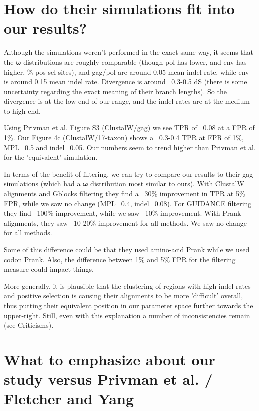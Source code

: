 \documentclass{article}
\newcommand{\omg}{\bm{\omega}\xspace}
\begin{document}
\section{How do their simulations fit into our results?}

Although the simulations weren't performed in the exact same way, it seems that the $\omg$ distributions are roughly comparable (though pol has lower, and env has higher, \% pos-sel sites), and gag/pol are around 0.05 mean indel rate, while env is around 0.15 mean indel rate. Divergence is around ~0.3-0.5 dS (there is some uncertainty regarding the exact meaning of their branch lengths). So the divergence is at the low end of our range, and the indel rates are at the medium-to-high end.

Using Privman et al. Figure S3 (ClustalW/gag) we see TPR of ~0.08 at a FPR of 1\%. Our Figure 4c (ClustalW/17-taxon) shows a ~0.3-0.4 TPR at FPR of 1\%, MPL=0.5 and indel=0.05. Our numbers seem to trend higher than Privman et al. for the 'equivalent' simulation.

In terms of the benefit of filtering, we can try to compare our results to their gag simulations (which had a $\omg$ distribution most similar to ours). With ClustalW alignments and Gblocks filtering they find a ~30\% improvement in TPR at 5\% FPR, while we saw no change (MPL=0.4, indel=0.08). For GUIDANCE filtering they find ~100\% improvement, while we saw ~10\% improvement. With Prank alignments, they saw ~10-20\% improvement for all methods. We saw no change for all methods.

Some of this difference could be that they used amino-acid Prank while we used codon Prank. Also, the difference between 1\% and 5\% FPR for the filtering measure could impact things.

More generally, it is plausible that the clustering of regions with high indel rates and positive selection is causing their alignments to be more 'difficult' overall, thus putting their equivalent position in our parameter space further towards the upper-right. Still, even with this explanation a number of inconsistencies remain (see Criticisms).

\section{What to emphasize about our study versus Privman et al. / Fletcher and Yang}
\end{document}

